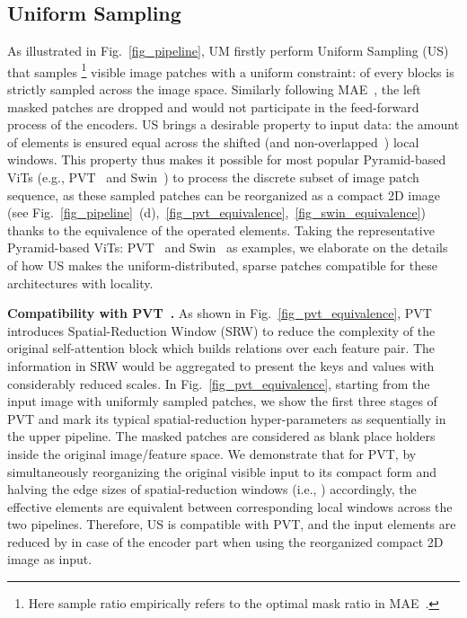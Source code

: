 \documentclass{article}
\begin{document}
\subsection{Uniform Sampling}
\label{sec_US}
As illustrated in Fig.~\ref{fig_pipeline}, UM firstly perform Uniform Sampling (US) that samples \footnote{\scriptsize Here  sample ratio empirically refers to the optimal mask ratio  in MAE~\cite{he2021masked}.} visible image patches with a uniform constraint:  of every  blocks is strictly sampled across the image space. Similarly following MAE~\cite{he2021masked}, the left  masked patches are dropped and would not participate in the feed-forward process of the encoders.
US brings a desirable property to input data: the amount of elements is ensured equal across the shifted (and non-overlapped~\cite{wang2021pyramid,liu2021swin}) local windows. This property thus makes it possible for most popular Pyramid-based ViTs (e.g., PVT~\cite{wang2021pyramid} and Swin~\cite{liu2021swin}) to process the discrete subset of image patch sequence, as these sampled patches can be reorganized as a compact 2D image (see Fig.~\ref{fig_pipeline}~(d),~\ref{fig_pvt_equivalence},~\ref{fig_swin_equivalence}) thanks to the equivalence of the operated elements.
Taking the representative Pyramid-based ViTs: PVT~\cite{wang2021pyramid} and Swin~\cite{liu2021swin} as examples, we elaborate on the details of how US makes the uniform-distributed, sparse patches compatible for these architectures with locality. 

\textbf{Compatibility with PVT~\cite{wang2021pyramid}.} As shown in Fig.~\ref{fig_pvt_equivalence}, PVT introduces Spatial-Reduction Window (SRW) to reduce the complexity of the original self-attention block which builds relations over each feature pair. The information in SRW would be aggregated to present the keys and values with considerably reduced scales. In Fig.~\ref{fig_pvt_equivalence}, starting from the input image with uniformly sampled patches, we show the first three stages of PVT and mark its typical spatial-reduction hyper-parameters as  sequentially in the upper pipeline. The masked patches are considered as blank place holders inside the original image/feature space. We demonstrate that for PVT, by simultaneously reorganizing the original visible input to its compact form and halving the edge sizes of spatial-reduction windows (i.e., ) accordingly, the effective elements are equivalent between corresponding local windows across the two pipelines. Therefore, US is compatible with PVT, and the input elements are reduced by  in case of the encoder part when using the reorganized compact 2D image as input.
\end{document}
